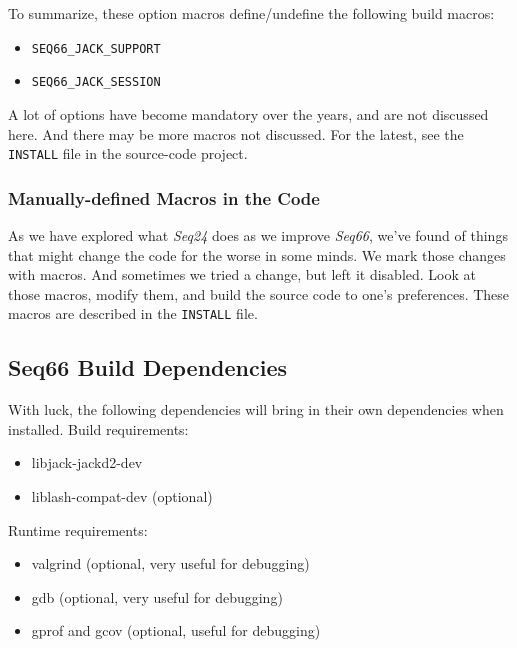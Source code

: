     To summarize, these option macros define/undefine the following build
    macros:

      \begin{itemize}
        \item \texttt{SEQ66\_JACK\_SUPPORT}
        \item \texttt{SEQ66\_JACK\_SESSION}
      \end{itemize}

   A lot of options have become mandatory over the years, and are not discussed
   here.  And there may be more macros not discussed.  For the latest, see the
   \texttt{INSTALL} file in the source-code project.

\subsubsection{Manually-defined Macros in the Code}
\label{subsubsec:build_macros}

   As we have explored what \textsl{Seq24} does as we improve
   \textsl{Seq66}, we've found of things that might change the code
   for the worse in some minds.
   We mark those changes with macros.
   And sometimes we tried a change, but left it disabled.
   Look at those macros, modify them, and build
   the source code to one's preferences.
   These macros are described in the \texttt{INSTALL} file.

\subsection{Seq66 Build Dependencies}
\label{subsec:build_dependencies}

   With luck, the following dependencies will bring in their own
   dependencies when installed.  Build requirements:

     \begin{itemize}
        \item libjack-jackd2-dev
        \item liblash-compat-dev (optional)
     \end{itemize}

   Runtime requirements:

     \begin{itemize}
        \item valgrind (optional, very useful for debugging)
        \item gdb (optional, very useful for debugging)
        \item gprof and gcov (optional, useful for debugging)
     \end{itemize}

